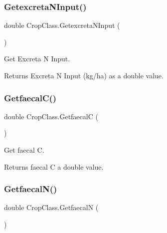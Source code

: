 \subsubsection{\texorpdfstring{GetexcretaNInput()}{GetexcretaNInput()}}
{\footnotesize\ttfamily double Crop\+Class.\+Getexcreta\+N\+Input (\begin{DoxyParamCaption}{ }\end{DoxyParamCaption})\hspace{0.3cm}{\ttfamily [inline]}}



Get Excreta N Input. 

\begin{DoxyReturn}{Returns}
Excreta N Input (kg/ha) as a double value. 
\end{DoxyReturn}
\mbox{\label{class_crop_class_a26c9d82c2f4d98dc994f19f3af374f2c}} 
\subsubsection{\texorpdfstring{GetfaecalC()}{GetfaecalC()}}
{\footnotesize\ttfamily double Crop\+Class.\+GetfaecalC (\begin{DoxyParamCaption}{ }\end{DoxyParamCaption})\hspace{0.3cm}{\ttfamily [inline]}}



Get faecal C. 

\begin{DoxyReturn}{Returns}
faecal C a double value. 
\end{DoxyReturn}
\mbox{\label{class_crop_class_aa08fbfc8bd23ced35bf9e4dcf491f780}} 
\subsubsection{\texorpdfstring{GetfaecalN()}{GetfaecalN()}}
{\footnotesize\ttfamily double Crop\+Class.\+GetfaecalN (\begin{DoxyParamCaption}{ }\end{DoxyParamCaption})\hspace{0.3cm}{\ttfamily [inline]}}



